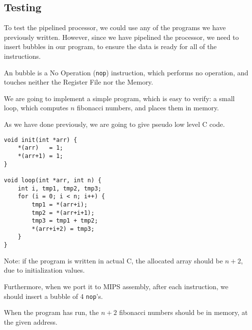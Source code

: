 \documentclass{beamer}
\begin{document}
\subsection{Testing}
\begin{frame}
    To test the pipelined processor, we could use any of the programs we have
    previously written. However, since we have pipelined the processor, we
    need to insert bubbles in our program, to ensure the data is ready for all
    of the instructions.

    \vspace{\baselineskip}
    An bubble is a No Operation (\texttt{nop}) instruction, which performs no
    operation, and touches neither the Register File nor the Memory.
\end{frame}
\begin{frame}
    We are going to implement a simple program, which is easy to verify: a
    small loop, which computes $n$ fibonacci numbers, and places them in
    memory.

    \vspace{\baselineskip}
    As we have done previously, we are going to give pseudo low level C code.
\end{frame}
\begin{frame}[fragile]
\begin{lstlisting}
void init(int *arr) {
    *(arr)   = 1;
    *(arr+1) = 1;
}

void loop(int *arr, int n) {
    int i, tmp1, tmp2, tmp3;
    for (i = 0; i < n; i++) {
        tmp1 = *(arr+i);
        tmp2 = *(arr+i+1);
        tmp3 = tmp1 + tmp2;
        *(arr+i+2) = tmp3;
    }
}
\end{lstlisting}
\end{frame}
\begin{frame}
    Note: if the program is written in actual C, the allocated array should be
    $n+2$, due to initialization values.

    \vspace{\baselineskip}
    Furthermore, when we port it to MIPS assembly, after each instruction, we
    should insert a bubble of 4 \texttt{nop}'s.

    \vspace{\baselineskip}
    When the program has run, the $n+2$ fibonacci numbers should be in memory,
    at the given address.
\end{frame}
\end{document}
